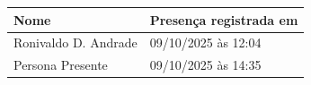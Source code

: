 \begin{longtable}{@{}p{} p{}@{}}
\toprule
\textbf{Nome} & \textbf{Presença registrada em} \\
\midrule
\endhead
Ronivaldo D. Andrade & 09/10/2025 às 12:04 \\
Persona Presente & 09/10/2025 às 14:35 \\
\bottomrule
\end{longtable}
